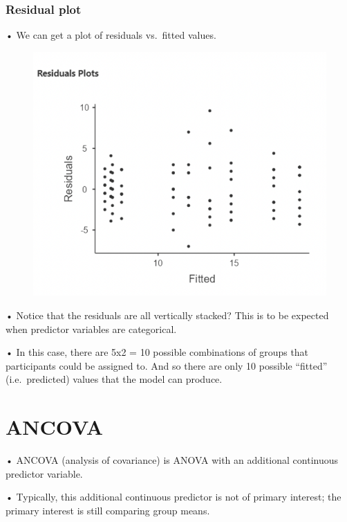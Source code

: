 \documentclass[
  letterpaper,
  DIV=11,
  numbers=noendperiod]{scrreprt}
\begin{document}
\hypertarget{residual-plot}{%
\subsubsection{Residual plot}\label{residual-plot}}

• We can get a plot of residuals vs.~fitted values.

\begin{figure}

{\centering \includegraphics{images/Mod5_17.png}

}

\end{figure}

• Notice that the residuals are all vertically stacked? This is to be
expected when predictor variables are categorical.

• In this case, there are 5x2 = 10 possible combinations of groups that
participants could be assigned to. And so there are only 10 possible
``fitted'' (i.e.~predicted) values that the model can produce.

\hypertarget{ancova}{%
\section{ANCOVA}\label{ancova}}

• ANCOVA (analysis of covariance) is ANOVA with an additional continuous
predictor variable.

• Typically, this additional continuous predictor is not of primary
interest; the primary interest is still comparing group means.
\end{document}
